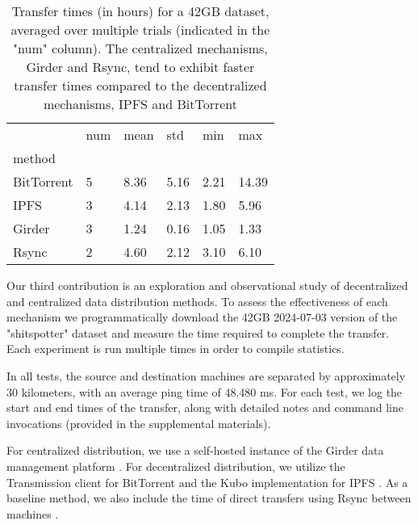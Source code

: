 \documentclass[10pt,twocolumn,letterpaper]{article}
\begin{document}
\begin{table}[t]
\begin{tabular}{llllll}
\toprule
{} & num &   mean &    std &   min &    max \\
method        &       &        &        &       &        \\
\midrule
BitTorrent & 5 & 8.36 & 5.16 & 2.21 & 14.39 \\
IPFS & 3 & 4.14 & 2.13 & 1.80 & 5.96 \\
Girder & 3 & 1.24 & 0.16 & 1.05 & 1.33 \\
Rsync & 2 & 4.60 & 2.12 & 3.10 & 6.10 \\
\bottomrule
\end{tabular}
\caption[]{
Transfer times (in hours) for a 42GB dataset, averaged over multiple trials (indicated in the "num" column).
The centralized mechanisms, Girder and Rsync, tend to exhibit faster transfer times compared to the
  decentralized mechanisms, IPFS and BitTorrent
}
\label{tab:transfertime}
\end{table}

Our third contribution is an exploration and observational study of decentralized and centralized data
  distribution methods.
To assess the effectiveness of each mechanism we programmatically download the 42GB 2024-07-03 version of
  the "shitspotter" dataset and measure the time required to complete the transfer.
Each experiment is run multiple times in order to compile statistics.

In all tests, the source and destination machines are separated by approximately 30 kilometers, with an
  average ping time of 48.480 ms.
For each test, we log the start and end times of the transfer, along with detailed notes and command line
  invocations (provided in the supplemental materials).

For centralized distribution, we use a self-hosted instance of the Girder data management platform
  \cite{girder_2024}.
For decentralized distribution, we utilize the Transmission client for BitTorrent \cite{transmission_2024}
  and the Kubo implementation for IPFS \cite{ipfskubo_2024}.
As a baseline method, we also include the time of direct transfers using Rsync between machines
  \cite{rsyncprojectrsync_2024}.
\end{document}

